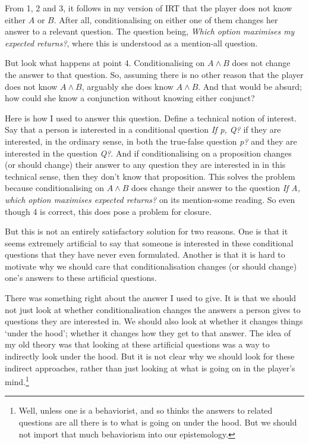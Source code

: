 \documentclass[11pt,]{book}
\let\rmarkdownfootnote\footnote%
\def\footnote{\protect\rmarkdownfootnote}
\begin{document}
From 1, 2 and 3, it follows in my version of IRT that the player does not know either \(A\) or \(B\). After all, conditionalising on either one of them changes her answer to a relevant question. The question being, \emph{Which option maximises my expected returns?}, where this is understood as a mention-all question.

But look what happens at point 4. Conditionalising on \(A \wedge B\) does not change the answer to that question. So, assuming there is no other reason that the player does not know \(A \wedge B\), arguably she does know \(A \wedge B\). And that would be absurd; how could she know a conjunction without knowing either conjunct?

Here is how I used to answer this question. Define a technical notion of interest. Say that a person is interested in a conditional question \emph{If p, Q?} if they are interested, in the ordinary sense, in both the true-false question \emph{p?} and they are interested in the question \emph{Q?}. And if conditionalising on a proposition changes (or should change) their answer to any question they are interested in in this technical sense, then they don't know that proposition. This solves the problem because conditionalising on \(A \wedge B\) does change their answer to the question \emph{If A, which option maximises expected returns?} on its mention-some reading. So even though 4 is correct, this does pose a problem for closure.

But this is not an entirely satisfactory solution for two reasons. One is that it seems extremely artificial to say that someone is interested in these conditional questions that they have never even formulated. Another is that it is hard to motivate why we should care that conditionalisation changes (or should change) one's answers to these artificial questions.

There was something right about the answer I used to give. It is that we should not just look at whether conditionalisation changes the answers a person gives to questions they are interested in. We should also look at whether it changes things `under the hood'; whether it changes how they get to that answer. The idea of my old theory was that looking at these artificial questions was a way to indirectly look under the hood. But it is not clear why we should look for these indirect approaches, rather than just looking at what is going on in the player's mind.\footnote{Well, unless one is a behaviorist, and so thinks the answers to related questions are all there is to what is going on under the hood. But we should not import that much behaviorism into our epistemology.}
\end{document}
